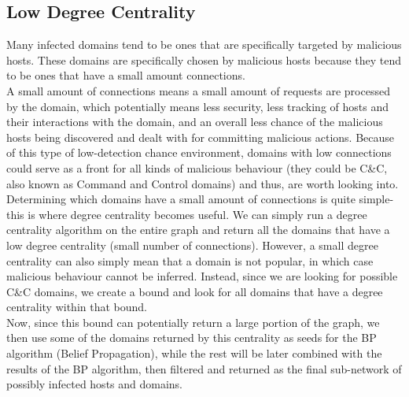 \documentclass{article} %
\begin{document}
\subsection{Low Degree Centrality}
Many infected domains tend to be ones that are specifically targeted by malicious hosts. These domains are specifically chosen by malicious hosts because they tend to be ones that have a small amount connections. \\
A small amount of connections means a small amount of requests are processed by the domain, which potentially means less security, less tracking of hosts and their interactions with the domain, and an overall 
less chance of the malicious hosts being discovered and dealt with for committing malicious actions. Because of this type of low-detection chance environment, domains with low connections could serve as a front 
for all kinds of malicious behaviour (they could be C\&C, also known as Command and Control domains) and thus, are worth looking into. \\
Determining which domains have a small amount of connections is quite simple- this is where degree centrality becomes useful. We can simply run a degree centrality algorithm on the entire graph and return all 
the domains that have a low degree centrality (small number of connections). However, a small degree centrality can also simply mean that a domain is not popular, in which case malicious behaviour cannot be inferred. 
Instead, since we are looking for possible C\&C domains, we create a bound and look for all domains that have a degree centrality within that bound. \\
Now, since this bound can potentially return a large portion of the graph, we then use some of the domains returned by this centrality as seeds for the BP algorithm (Belief Propagation), while the rest will be later 
combined with the results of the BP algorithm, then filtered and returned as the final sub-network of possibly infected hosts and domains. 
\end{document}
